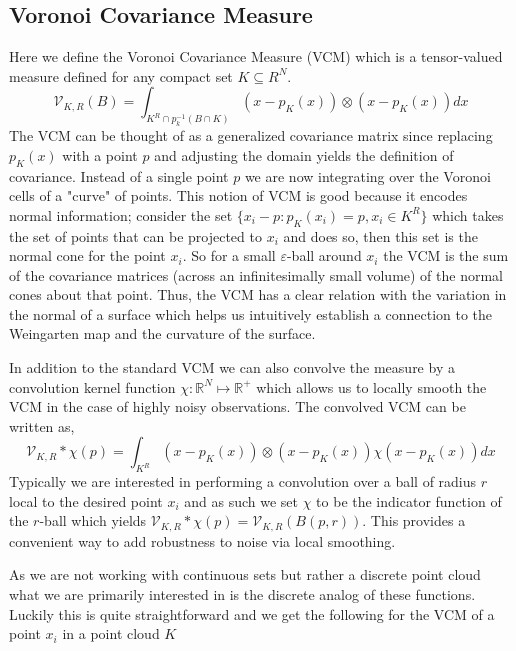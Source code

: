 \documentclass{article}
\begin{document}
\subsection{Voronoi Covariance Measure}
Here we define the Voronoi Covariance Measure (VCM) which is a tensor-valued measure defined for any compact set $K \subseteq R^N$.
\begin{equation} \label{VCM_eq}
    \mathcal{V}_{K,R}(B) = \int_{K^R \cap p_k^{-1}(B \cap K)}(x - p_K(x)) \otimes (x - p_K(x)) dx
\end{equation}
The VCM can be thought of as a generalized covariance matrix since replacing $p_K(x)$ with a point $p$ and adjusting the domain yields the definition of covariance. Instead of a single point $p$ we are now integrating over the Voronoi cells of a "curve" of points. This notion of VCM is good because it encodes normal information; consider the set $\{x_i - p : p_K(x_i) = p, x_i \in K^{R}\}$ which takes the set of points that can be projected to $x_i$ and does so, then this set is the normal cone for the point $x_i$. So for a small $\varepsilon$-ball around $x_i$ the VCM is the sum of the covariance matrices (across an infinitesimally small volume) of the normal cones about that point. Thus, the VCM has a clear relation with the variation in the normal of a surface which helps us intuitively establish a connection to the Weingarten map and the curvature of the surface.   

In addition to the standard VCM we can also convolve the measure by a convolution kernel function $\chi : \mathbb{R}^N \mapsto \mathbb{R}^+$ which allows us to locally smooth the VCM in the case of highly noisy observations. The convolved VCM can be written as,
\begin{equation}
    \mathcal{V}_{K,R}*\chi (p) = \int_{K^R}(x - p_K(x)) \otimes (x - p_K(x)) \chi(x - p_K(x)) dx
\end{equation}
Typically we are interested in performing a convolution over a ball of radius $r$ local to the desired point $x_i$ and as such we set $\chi$ to be the indicator function of the $r$-ball which yields $\mathcal{V}_{K,R}*\chi (p) = \mathcal{V}_{K,R}(B(p,r))$. This provides a convenient way to add robustness to noise via local smoothing.

As we are not working with continuous sets but rather a discrete point cloud what we are primarily interested in is the discrete analog of these functions. Luckily this is quite straightforward and we get the following for the VCM of a point $x_i$ in a point cloud $K$
\end{document}
